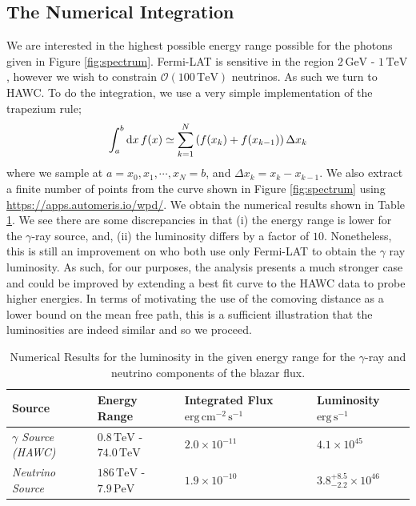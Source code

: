 \documentclass[10pt]{article}
\begin{document}
\subsection{The Numerical Integration}
We are interested in the highest possible energy range possible for the photons given in Figure \ref{fig:spectrum}. Fermi-LAT is sensitive in the region $2\,\textrm{GeV}$ - $1 \, \textrm{TeV}$ \cite{Padovani2018}, however we wish to constrain $\mathcal{O}(100\,\textrm{TeV})$ neutrinos. As such we turn to HAWC. To do the integration, we use a very simple implementation of the trapezium rule;
\begin{equation}
\int_a^b{\text{d}x \,f(x)} \simeq \sum_{k = 1}^N{\left(f(x_k) + f(x_{k - 1})\right)\Delta x_k}
\end{equation}
where we sample at $a = x_0, x_1, \cdots, x_N = b$, and $\Delta x_k = x_{k} - x_{k - 1}$. We also extract a finite number of points from the curve shown in Figure \ref{fig:spectrum} using \href{https://apps.automeris.io/wpd/}{https://apps.automeris.io/wpd/}. We obtain the numerical results shown in Table \ref{tab:luminosity}. We see there are some discrepancies in that (i) the energy range is lower for the $\gamma$-ray source, and, (ii) the luminosity differs by a factor of $10$. Nonetheless, this is still an improvement on \cite{Kellya, Padovani2018} who both use only Fermi-LAT to obtain the $\gamma$ ray luminosity. As such, for our purposes, the analysis presents a much stronger case and could be improved by extending a best fit curve to the HAWC data to probe higher energies. In terms of motivating the use of the comoving distance as a lower bound on the mean free path, this is a sufficient illustration that the luminosities are indeed similar and so we proceed.
\begin{table}[h]
\centering
\begin{framed}
\begin{tabular}{p{3.0cm}p{3cm}p{5.0cm}p{4.0cm}}
\toprule \textbf{Source} & \textbf{Energy Range} & \textbf{Integrated Flux} $\text{erg}\, \text{cm}^{-2}\,\text{s}^{-1}$ & \textbf{Luminosity} $\text{erg}\,\text{s}^{-1}$\\
\midrule
\textit{$\gamma$ Source (HAWC)} & $0.8 \, \textrm{TeV}$ - $74.0 \, \textrm{TeV}$ & $2.0 \times 10^{-11}$ & $4.1 \times 10^{45}$ \\
\textit{Neutrino Source} & $186 \, \textrm{TeV}$ - $7.9 \, \textrm{PeV}$ & $1.9 \times 10^{-10}$ & $3.8^{+8.5}_{-2.2} \times 10^{46}$ \\
\bottomrule
\end{tabular}
\caption{Numerical Results for the luminosity in the given energy range for the $\gamma$-ray and neutrino components of the blazar flux.}
\label{tab:luminosity}
\end{framed}
\end{table}
\end{document}
